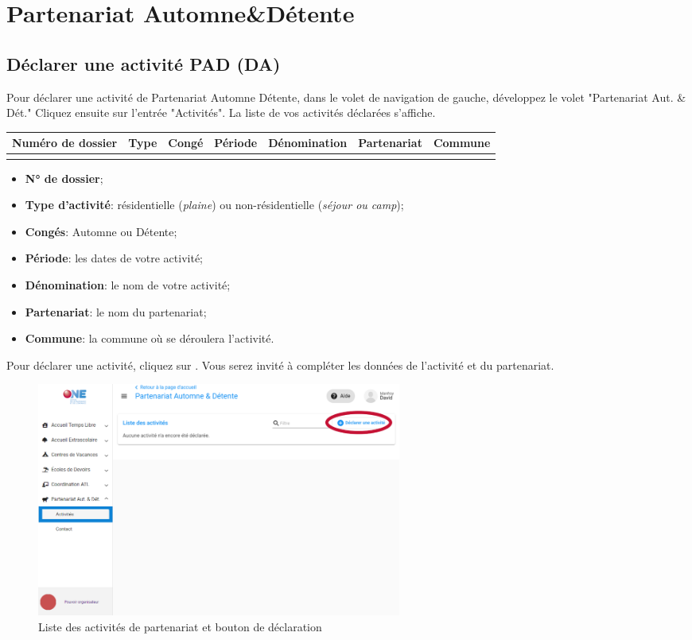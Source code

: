 \chapter{Partenariat Automne\&Détente}
\section{Déclarer une activité PAD (DA)}
Pour déclarer une activité de Partenariat Automne Détente, dans le volet de navigation de gauche, développez le volet "Partenariat Aut. \& Dét."  Cliquez ensuite sur l'entrée "Activités". La liste de vos activités déclarées s'affiche.

\medskip

\begin{center}
\begin{tabular}{|c|c|c|c|c|c|c|}
\hline
Numéro de dossier & Type & Congé & Période & Dénomination & Partenariat & Commune\\
  \hline
& & & & & &\\
  \hline
\end{tabular}
\end{center}
\smallskip



\begin{itemize}
    \item \textbf{N° de dossier}; 
    \item \textbf{Type d'activité}: résidentielle (\textit{plaine}) ou non-résidentielle (\textit{séjour ou camp});
    \item \textbf{Congés}: Automne ou Détente;
    \item \textbf{Période}: les dates de votre activité;
    \item \textbf{Dénomination}: le nom de votre activité;
    \item \textbf{Partenariat}: le nom du partenariat; 
    \item \textbf{Commune}: la commune où se déroulera l'activité.
\end{itemize}

Pour déclarer une activité, cliquez sur . Vous serez invité à compléter les données de l'activité et du partenariat. 

\begin{figure}[ht!]
    \centering
    \includegraphics[width=12cm]{Images/pad/liste-acti.png}
    \caption{Liste des activités de partenariat et bouton de déclaration}
    \label{fig:pad_liste}
\end{figure}


